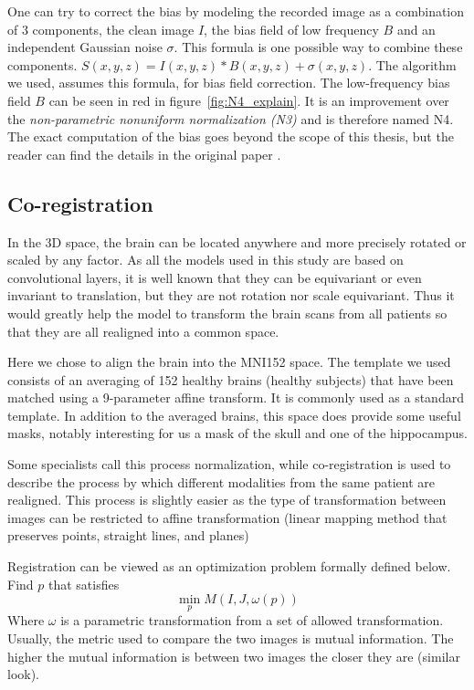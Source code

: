 One can try to correct the bias by modeling the recorded image as a combination of 3 components, the clean image $I$, the bias field of low frequency $B$ and an independent Gaussian noise $\sigma$. This formula is one possible way to combine these components. $S(x,y,z)= I(x,y,z)*B(x,y,z) +\sigma(x,y,z)$. The algorithm we used, assumes this formula, for bias field correction. The low-frequency bias field $B$ can be seen in red in figure~\ref{fig:N4_explain}. It is an improvement over the \textit{non-parametric nonuniform normalization (N3)} and is therefore named N4. 
The exact computation of the bias goes beyond the scope of this thesis, but the reader can find the details in the original paper \cite{N4_paper}.


\subsection{Co-registration}
\label{sec:coregistration}

In the 3D space, the brain can be located anywhere and more precisely rotated or scaled by any factor. As all the models used in this study are based on convolutional layers, it is well known that they can be equivariant or even invariant to translation, but they are not rotation nor scale equivariant. Thus it would greatly help the model to transform the brain scans from all patients so that they are all realigned into a common space. 

Here we chose to align the brain into the MNI152 space\footnotemark{}. The template we used consists of an averaging of 152 healthy brains (healthy subjects) that have been matched using a 9-parameter affine transform. It is commonly used as a standard template. In addition to the averaged brains, this space does provide some useful masks, notably interesting for us a mask of the skull and one of the hippocampus.

Some specialists call this process normalization, while co-registration is used to describe the process by which different modalities from the same patient are realigned. This process is slightly easier as the type of transformation between images can be restricted to affine transformation (linear mapping method that preserves points, straight lines, and planes)

Registration can be viewed as an optimization problem formally defined below.
Find $p$ that satisfies
$$\displaystyle  \min_{p} M(I,J, \omega(p))$$
Where $\omega$ is a parametric transformation from a set of allowed transformation. Usually, the metric used to compare the two images is mutual information. The higher the mutual information is between two images the closer they are (similar look).

